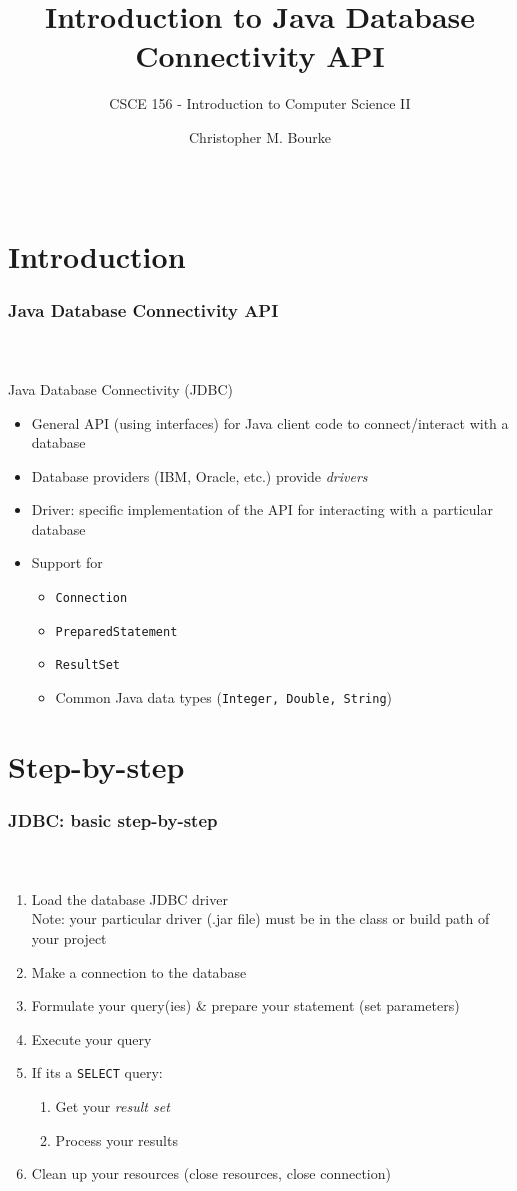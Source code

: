\documentclass{beamer}
\title[CSCE 156]{Introduction to Java Database Connectivity API}
\subtitle{CSCE 156 - Introduction to Computer Science II}
\author[Bourke]{Christopher M. Bourke\\ \email{cbourke@cse.unl.edu}} %
\date{~}
\begin{document}
\begin{frame}
        \titlepage
\end{frame}

\section{Introduction}

\begin{frame}[fragile]
  \frametitle{Java Database Connectivity API}
  \framesubtitle{~}

Java Database Connectivity (JDBC)

\begin{itemize}
  \item General API (using interfaces) for Java client code to connect/interact with a database
  \item Database providers (IBM, Oracle, etc.) provide \emph{drivers}
  \item Driver: specific implementation of the API for interacting with a particular database 
  \item Support for 
  \begin{itemize}
    \item \texttt{Connection}
    \item \texttt{PreparedStatement}
    \item \texttt{ResultSet}
    \item Common Java data types (\texttt{Integer, Double, String})
  \end{itemize}
\end{itemize}

\end{frame}

\section{Step-by-step}

\begin{frame}[fragile]
  \frametitle{JDBC: basic step-by-step}
  \framesubtitle{~}

\begin{enumerate}
  \item Load the database JDBC driver\\
	Note: your particular driver (.jar file) must be in the class or build path of your project
  \item Make a connection to the database
  \item Formulate your query(ies) \& prepare your statement (set parameters)
  \item Execute your query
  \item If its a \texttt{SELECT} query: 
    \begin{enumerate}
      \item Get your \emph{result set}
      \item Process your results
    \end{enumerate}
  \item Clean up your resources (close resources, close connection)
\end{enumerate}

\end{frame}
\end{document}
